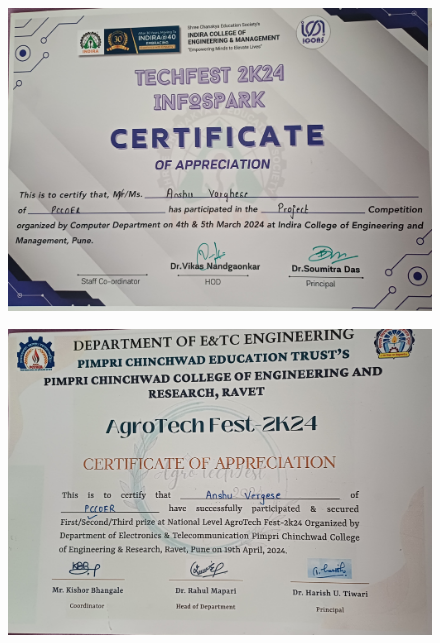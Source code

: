 \documentclass[12pt,a4paper]{report}
\begin{document}
\begin{figure}[!htb]
\begin{center}
\includegraphics[scale=0.1]{images/certificates/certificates/Anshu1.jpg}
\end{center}
\end{figure}
\begin{figure}[!htb]
\begin{center}
\includegraphics[scale=0.1]{images/certificates/certificates/Anshu2.jpg}
\end{center}
\end{figure}
\newpage
\end{document}
